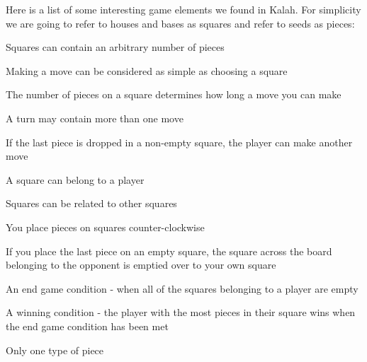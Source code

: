 Here is a list of some interesting game elements we found in Kalah. For
simplicity we are going to refer to houses and bases as squares and refer to
seeds as pieces:

\begin{dlist}
  \item Squares can contain an arbitrary number of pieces
  \item Making a move can be considered as simple as choosing a square
  \item The number of pieces on a square determines how long a move you can make
  \item A turn may contain more than one move
    \begin{dlist}
      \item If the last piece is dropped in a non-empty square, the player can
	make another move
    \end{dlist}
  \item A square can belong to a player
  \item Squares can be related to other squares
    \begin{dlist}
      \item You place pieces on squares counter-clockwise
      \item If you place the last piece on an empty square, the square across
	the board belonging to the opponent is emptied over to your own square
    \end{dlist}
  \item An end game condition - when all of the squares belonging to a player are
    empty
  \item A winning condition - the player with the most pieces in their square
    wins when the end game condition has been met
  \item Only one type of piece
\end{dlist}
